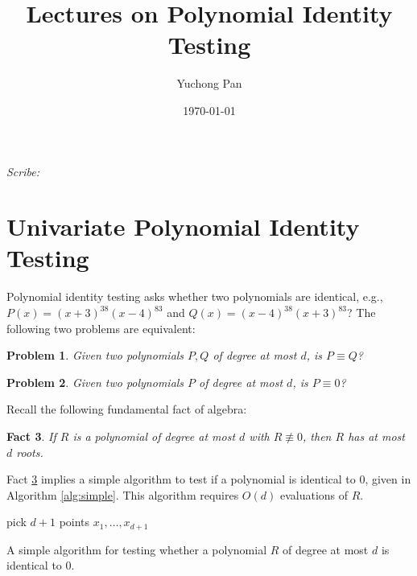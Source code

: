 \documentclass[letterpaper, reqno,11pt]{article}
\begin{document}
\title{Lectures on Polynomial Identity Testing}
\author{Yuchong Pan}
\date{\today}
\newtheorem{theorem}{Theorem}
\newtheorem{lemma}[theorem]{Lemma}
\newtheorem{proposition}[theorem]{Proposition}
\newtheorem{corollary}[theorem]{Corollary}
\newtheorem{fact}[theorem]{Fact}
\newtheorem{problem}[theorem]{Problem}
\newtheorem{claim}{Claim}
\newtheorem{exercise}{Exercise}
\theoremstyle{definition}
\newtheorem{definition}[theorem]{Definition}
%

\begin{framed}
 \hfill \thedate
\begin{center}
\Large{\thetitle}
\end{center}
 \hfill {\em Scribe: \theauthor}
\end{framed}

\section{Univariate Polynomial Identity Testing}

Polynomial identity testing asks whether two polynomials are identical, e.g., $P(x) = (x + 3)^{38} (x - 4)^{83}$ and $Q(x) = (x - 4)^{38} (x + 3)^{83}$? The following two problems are equivalent:

\begin{problem}
  Given two polynomials $P, Q$ of degree at most $d$, is $P \equiv Q$?
\end{problem}

\begin{problem}
  Given two polynomials $P$ of degree at most $d$, is $P \equiv 0$?
\end{problem}

Recall the following fundamental fact of algebra:

\begin{fact} \label{fact:poly}
  If $R$ is a polynomial of degree at most $d$ with $R \not \equiv 0$, then $R$ has at most $d$ roots.
\end{fact}

Fact \ref{fact:poly} implies a simple algorithm to test if a polynomial is identical to $0$, given in Algorithm \ref{alg:simple}. This algorithm requires $O(d)$ evaluations of $R$.

\begin{algorithm}
  pick $d + 1$ points $x_1, \ldots, x_{d + 1}$ \\
  \caption{A simple algorithm for testing whether a polynomial $R$ of degree at most $d$ is identical to $0$.}
  \label{alg:simple}
\end{algorithm}
\end{document}
